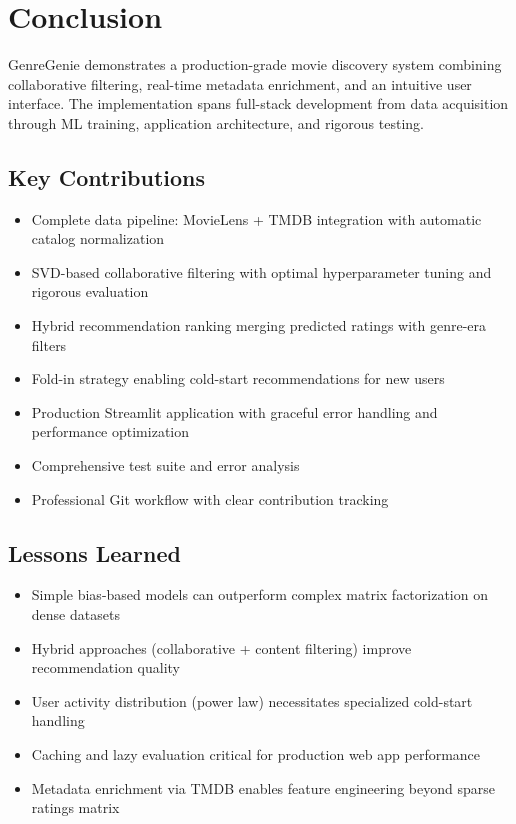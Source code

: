 \documentclass[11pt,a4paper]{article}
\begin{document}

\section{Conclusion}

GenreGenie demonstrates a production-grade movie discovery system combining collaborative filtering, real-time metadata enrichment, and an intuitive user interface. The implementation spans full-stack development from data acquisition through ML training, application architecture, and rigorous testing.

\subsection{Key Contributions}

\begin{itemize}
    \item Complete data pipeline: MovieLens + TMDB integration with automatic catalog normalization
    \item SVD-based collaborative filtering with optimal hyperparameter tuning and rigorous evaluation
    \item Hybrid recommendation ranking merging predicted ratings with genre-era filters
    \item Fold-in strategy enabling cold-start recommendations for new users
    \item Production Streamlit application with graceful error handling and performance optimization
    \item Comprehensive test suite and error analysis
    \item Professional Git workflow with clear contribution tracking
\end{itemize}

\subsection{Lessons Learned}

\begin{itemize}
    \item Simple bias-based models can outperform complex matrix factorization on dense datasets
    \item Hybrid approaches (collaborative + content filtering) improve recommendation quality
    \item User activity distribution (power law) necessitates specialized cold-start handling
    \item Caching and lazy evaluation critical for production web app performance
    \item Metadata enrichment via TMDB enables feature engineering beyond sparse ratings matrix
\end{itemize}
\end{document}
